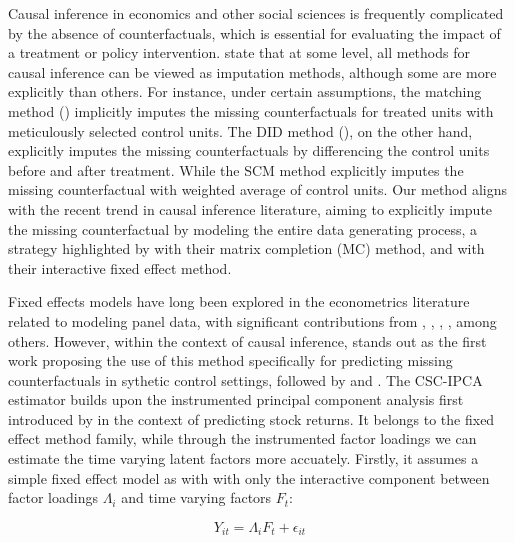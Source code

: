 \documentclass[12pt]{article}
\begin{document}
Causal inference in economics and other social sciences is frequently complicated by the absence of counterfactuals, which is essential for evaluating the impact of a treatment or policy intervention. \cite{imbens2015causal} state that at some level, all methods for causal inference can be viewed as imputation methods, although some are more explicitly than others. For instance, under certain assumptions, the matching method (\cite{abadie2006large, abadie2011bias}) implicitly imputes the missing counterfactuals for treated units with meticulously selected control units. The DID method (\cite{card1993minimum, ashenfelter1978estimating}), on the other hand, explicitly imputes the missing counterfactuals by differencing the control units before and after treatment. While the SCM method explicitly imputes the missing counterfactual with weighted average of control units. Our method aligns with the recent trend in causal inference literature, aiming to explicitly impute the missing counterfactual by modeling the entire data generating process, a strategy highlighted by \cite{athey2021matrix} with their matrix completion (MC) method, and \cite{xu2017generalized} with their interactive fixed effect method.

Fixed effects models have long been explored in the econometrics literature related to modeling panel data, with significant contributions from \cite{bai2003computation}, \cite{pesaran2006estimation}, \cite{stock2002forecasting}, \cite{eberhardt2009cross}, among others. However, within the context of causal inference, \cite{hsiao2012panel} stands out as the first work proposing the use of this method specifically for predicting missing counterfactuals in sythetic control settings, followed by \cite{gobillon2016regional, xu2017generalized, chan2016policy} and \cite{li2018inference}. The CSC-IPCA estimator builds upon the instrumented principal component analysis first introduced by \cite{kelly2020instrumented, kelly2019characteristics} in the context of predicting stock returns. It belongs to the fixed effect method family, while through the instrumented factor loadings we can estimate the time varying latent factors more accuately. Firstly, it assumes a simple fixed effect model as with \cite{bai2003computation} with only the interactive component between factor loadings $\Lambda_i$ and time varying factors $F_t$:

\begin{equation}
\label{eqn: static}
    Y_{it} = \Lambda_i F_t + \epsilon_{it}
\end{equation}
\end{document}
